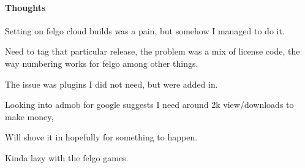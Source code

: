 

\paragraph{Thoughts}

Setting on felgo cloud builds was a pain, but somehow I managed to do it.

Need to tag that particular release, the problem was a mix of license code, the way numbering works for felgo among other things.

The issue was plugins I did not need, but were added in.

Looking into admob for google suggests I need around 2k view/downloads to make money,

Will shove it in hopefully for something to happen.

Kinda lazy with the felgo games.
